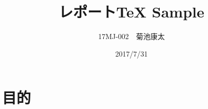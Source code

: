 \documentclass[titlepage,12pt,a4paper]{jarticle}
\title{レポートTeX Sample}
\date{2017/7/31}
\author{17MJ-002　菊池康太}
\begin{document}
\maketitle



\section{目的}



\end{document}
